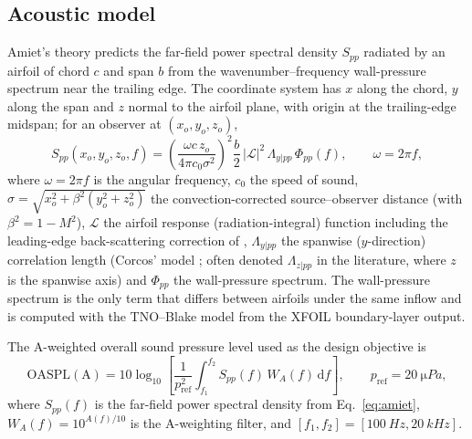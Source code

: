 \documentclass[preprint,3p,times]{elsarticle}
\begin{document}
\subsection{Acoustic model}
Amiet's theory \citep{Amiet1976} predicts the far-field power spectral density
$S_{pp}$ radiated by an airfoil of chord $c$ and span $b$ from the
wavenumber--frequency wall-pressure spectrum near the trailing edge. The
coordinate system has $x$ along the chord, $y$ along the span and $z$ normal
to the airfoil plane, with origin at the trailing-edge midspan; for an
observer at $(x_o,y_o,z_o)$,
\begin{equation}
S_{pp}(x_o,y_o,z_o,f)=
\left(\frac{\omega c\, z_o}{4\pi c_0 \sigma^2}\right)^2
\frac{b}{2}\,\bigl|\mathcal{L}\bigr|^2\,\Lambda_{y|pp}\,\Phi_{pp}(f),
\qquad \omega=2\pi f,
\label{eq:amiet}
\end{equation}
where $\omega=2\pi f$ is the angular frequency, $c_0$ the speed of sound,
$\sigma=\sqrt{x_o^2+\beta^2(y_o^2+z_o^2)}$ the convection-corrected
source--observer
distance (with $\beta^2=1-M^2$), $\mathcal{L}$ the airfoil response
(radiation-integral) function including the leading-edge back-scattering
correction of \citet{RogerMoreau2005,MoreauRoger2009},
$\Lambda_{y|pp}$ the spanwise ($y$-direction) correlation length (Corcos'
model \citep{Corcos1964}; often denoted $\Lambda_{z|pp}$ in the literature,
where $z$ is the spanwise axis) and
$\Phi_{pp}$ the wall-pressure spectrum. The wall-pressure spectrum is the only
term that differs between airfoils under the same inflow and is computed with
the TNO--Blake model \citep{Parchen1998} from the XFOIL boundary-layer output.

The A-weighted overall sound pressure level used as the design objective is
\begin{equation}
\mathrm{OASPL(A)}=10\log_{10}\!\left[\frac{1}{p_\mathrm{ref}^2}
\int_{f_1}^{f_2} \! S_{pp}(f)\,W_A(f)\,\mathrm{d}f\right],\qquad
p_\mathrm{ref}=\SI{20}{\micro Pa},
\label{eq:oaspl}
\end{equation}
where $S_{pp}(f)$ is the far-field power spectral density from
Eq.~\eqref{eq:amiet}, $W_A(f)=10^{A(f)/10}$ is the A-weighting filter, and
$[f_1,f_2]=[\SI{100}{Hz},\SI{20}{kHz}]$.
\end{document}
